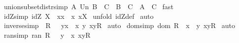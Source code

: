 \begin{isabellebody}
\ union{\isacharunderscore}subset{\isacharunderscore}distr{\isacharbrackleft}simp{\isacharbrackright}{\isacharcolon}\ {\isachardoublequoteopen}{\isacharparenleft}A\ Un\ B\ {\isacharless}{\isacharequal}\ C{\isacharparenright}\ {\isacharequal}\ {\isacharparenleft}B\ {\isacharless}{\isacharequal}\ C\ {\isacharampersand}\ A\ {\isacharless}{\isacharequal}\ C{\isacharparenright}{\isachardoublequoteclose}\isanewline
%
\isadelimproof
%
\endisadelimproof
%
\isatagproof
{}\isamarkupfalse%
\ fast\isanewline
{}\isamarkupfalse%
%
\endisatagproof
{\isafoldproof}%
%
\isadelimproof
%
\endisadelimproof
%
\isamarkuptrue%
\isamarkupfalse%
\ idZ{\isacharunderscore}simp{\isacharcolon}\ {\isachardoublequoteopen}idZ\ X\ {\isacharequal}\ {\isacharbraceleft}{\isacharparenleft}x{\isacharcomma}x{\isacharparenright}\ {\isacharbar}\ x{\isachardot}\ x{\isacharcolon}X{\isacharbraceright}{\isachardoublequoteclose}\isanewline
%
\isadelimproof
%
\endisadelimproof
%
\isatagproof
{}\isamarkupfalse%
\ {\isacharparenleft}unfold\ idZ{\isacharunderscore}def{\isacharparenright}\isanewline
{}\isamarkupfalse%
\ auto\isanewline
{}\isamarkupfalse%
%
\endisatagproof
{\isafoldproof}%
%
\isadelimproof
\isanewline
%
\endisadelimproof
\isanewline
{}\isamarkupfalse%
\ inverse{\isacharunderscore}simp{\isacharcolon}\ \ {\isachardoublequoteopen}R\ {\isacharpercent}{\isachartilde}\ {\isacharequal}\ {\isacharbraceleft}{\isacharparenleft}y{\isacharcomma}x{\isacharparenright}\ {\isacharbar}\ x\ y{\isachardot}\ {\isacharparenleft}x{\isacharcomma}y{\isacharparenright}{\isacharcolon}R{\isacharbraceright}{\isachardoublequoteclose}\isanewline
%
\isadelimproof
%
\endisadelimproof
%
\isatagproof
{}\isamarkupfalse%
\ auto\isanewline
{}\isamarkupfalse%
%
\endisatagproof
{\isafoldproof}%
%
\isadelimproof
\isanewline
%
\endisadelimproof
\isanewline
{}\isamarkupfalse%
\ dom{\isacharunderscore}simp{\isacharcolon}\ {\isachardoublequoteopen}dom\ R\ {\isacharequal}\ {\isacharbraceleft}x{\isachardot}\ {\isacharquery}\ y{\isachardot}\ {\isacharparenleft}x{\isacharcomma}y{\isacharparenright}{\isacharcolon}R{\isacharbraceright}{\isachardoublequoteclose}\isanewline
%
\isadelimproof
%
\endisadelimproof
%
\isatagproof
{}\isamarkupfalse%
\ auto\isanewline
{}\isamarkupfalse%
%
\endisatagproof
{\isafoldproof}%
%
\isadelimproof
\isanewline
%
\endisadelimproof
\isanewline
{}\isamarkupfalse%
\ ran{\isacharunderscore}simp{\isacharcolon}\ {\isachardoublequoteopen}ran\ R\ \ {\isacharequal}\ {\isacharbraceleft}y{\isachardot}\ {\isacharquery}\ x{\isachardot}\ {\isacharparenleft}x{\isacharcomma}y{\isacharparenright}{\isacharcolon}R{\isacharbraceright}{\isachardoublequoteclose}\isanewline

\end{isabellebody}
